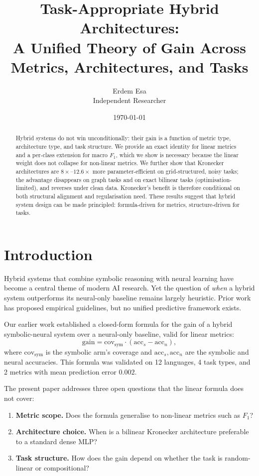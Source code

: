\documentclass[11pt,a4paper]{article}
\title{Task-Appropriate Hybrid Architectures:\\
A Unified Theory of Gain Across Metrics, Architectures, and Tasks}
\author{Erdem Esa\\ \small Independent Researcher}
\date{\today}
\begin{document}
\maketitle

\begin{abstract}
Hybrid systems do not win unconditionally: their gain is a function of
metric type, architecture type, and task structure. We provide an exact
identity for linear metrics and a per-class extension for macro $F_1$,
which we show is necessary because the linear weight does not collapse
for non-linear metrics. We further show that Kronecker architectures are
$8\times$--$12.6\times$ more parameter-efficient on grid-structured,
noisy tasks; the advantage disappears on graph tasks and on exact
bilinear tasks (optimisation-limited), and reverses under clean data.
Kronecker's benefit is therefore conditional on both structural
alignment and regularisation need. These results suggest that hybrid system
design can be made principled: formula-driven for metrics,
structure-driven for tasks.
\end{abstract}


\section{Introduction}
\label{sec:intro}

Hybrid systems that combine symbolic reasoning with neural learning have
become a central theme of modern AI research. Yet the question of
\emph{when} a hybrid system outperforms its neural-only baseline remains
largely heuristic. Prior work has proposed empirical guidelines, but no
unified predictive framework exists.

Our earlier work \cite{esa2026preprint1} established a closed-form
formula for the gain of a hybrid symbolic-neural system over a neural-only
baseline, valid for linear metrics:
\begin{equation}
\text{gain} = \text{cov}_{\text{sym}} \cdot (\text{acc}_s - \text{acc}_n),
\label{eq:linear}
\end{equation}
where $\text{cov}_{\text{sym}}$ is the symbolic arm's coverage and
$\text{acc}_s, \text{acc}_n$ are the symbolic and neural accuracies.
This formula was validated on 12 languages, 4 task types, and 2 metrics
with mean prediction error $0.002$.

The present paper addresses three open questions that the linear formula
does not cover:

\begin{enumerate}
\item \textbf{Metric scope.} Does the formula generalise to non-linear
metrics such as $F_1$?
\item \textbf{Architecture choice.} When is a bilinear Kronecker
architecture preferable to a standard dense MLP?
\item \textbf{Task structure.} How does the gain depend on whether the
task is random-linear or compositional?
\end{enumerate}
\end{document}
